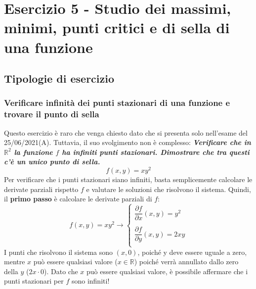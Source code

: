 \documentclass[a4paper]{article}
\begin{document}
	\newpage

	\section{Esercizio 5 - Studio dei massimi, minimi, punti critici e di sella di una funzione}
	
	\subsection{Tipologie di esercizio}

	\subsubsection{Verificare infinità dei punti stazionari di una funzione e trovare il punto di sella}\label{par: verificare infinità dei punti stazionari di una funzione e trovare il punto di sella}

	Questo esercizio è raro che venga chiesto dato che si presenta solo nell'esame del 25/06/2021(A). Tuttavia, il suo svolgimento non è complesso: \textcolor{Green4}{\textbf{\emph{Verificare che in $\mathbb{R}^{2}$ la funzione $f$ ha infiniti punti stazionari. Dimostrare che tra questi c'è un unico punto di sella.}}
	\begin{equation*}
		f\left(x,y\right) = xy^{2}
	\end{equation*}}
	Per verificare che i punti stazionari siano infiniti, basta semplicemente calcolare le derivate parziali rispetto $f$ e valutare le soluzioni che risolvono il sistema. Quindi, il \textbf{primo passo} è calcolare le derivate parziali di $f$:
	\begin{equation*}
		f\left(x,y\right) = xy^{2} \longrightarrow
		\begin{cases}
			\dfrac{\partial f}{\partial x}\left(x,y\right) = y^{2} \\
			\\
			\dfrac{\partial f}{\partial y}\left(x,y\right) = 2xy \\
		\end{cases}
	\end{equation*}
	I punti che risolvono il sistema sono $\left(x, 0\right)$, poiché y deve essere uguale a zero, mentre $x$ può essere qualsiasi valore ($x \in \mathbb{R}$) poiché verrà annullato dallo zero della $y$ ($2x \cdot 0$). Dato che $x$ può essere qualsiasi valore, è possibile affermare che i punti stazionari per $f$ sono infiniti!\newline
\end{document}
